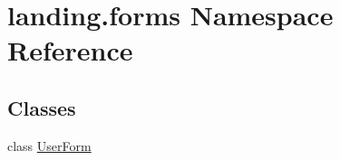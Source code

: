 \hypertarget{namespacelanding_1_1forms}{}\section{landing.\+forms Namespace Reference}
\label{namespacelanding_1_1forms}
\subsection*{Classes}
\begin{DoxyCompactItemize}
\item 
class \mbox{\hyperlink{classlanding_1_1forms_1_1UserForm}{User\+Form}}
\end{DoxyCompactItemize}
